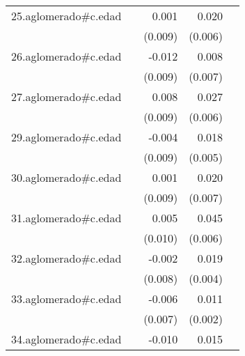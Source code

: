 {\begin{longtable}{l*{4}{D{.}{.}{-1}}}
\addlinespace
25.aglomerado#c.edad&                     &       0.001         &       0.020\sym{***}&                     \\
            &                     &     (0.009)         &     (0.006)         &                     \\
\addlinespace
26.aglomerado#c.edad&                     &      -0.012         &       0.008         &                     \\
            &                     &     (0.009)         &     (0.007)         &                     \\
\addlinespace
27.aglomerado#c.edad&                     &       0.008         &       0.027\sym{***}&                     \\
            &                     &     (0.009)         &     (0.006)         &                     \\
\addlinespace
29.aglomerado#c.edad&                     &      -0.004         &       0.018\sym{***}&                     \\
            &                     &     (0.009)         &     (0.005)         &                     \\
\addlinespace
30.aglomerado#c.edad&                     &       0.001         &       0.020\sym{**} &                     \\
            &                     &     (0.009)         &     (0.007)         &                     \\
\addlinespace
31.aglomerado#c.edad&                     &       0.005         &       0.045\sym{***}&                     \\
            &                     &     (0.010)         &     (0.006)         &                     \\
\addlinespace
32.aglomerado#c.edad&                     &      -0.002         &       0.019\sym{***}&                     \\
            &                     &     (0.008)         &     (0.004)         &                     \\
\addlinespace
33.aglomerado#c.edad&                     &      -0.006         &       0.011\sym{***}&                     \\
            &                     &     (0.007)         &     (0.002)         &                     \\
\addlinespace
34.aglomerado#c.edad&                     &      -0.010         &       0.015\sym{*}  &                     \\

\end{longtable}}
